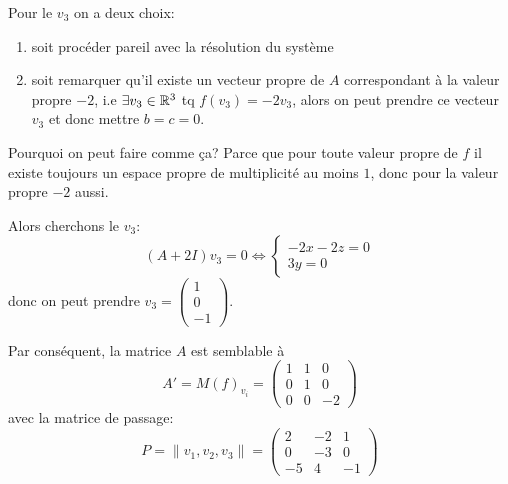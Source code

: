 \begin{eg}
    Pour le $v_3$ on a deux choix:
     \begin{enumerate}
        \item soit procéder pareil avec la résolution du système
        \item soit remarquer qu'il existe un vecteur propre de $A$ correspondant à la valeur propre  $-2$, i.e  $\exists v_3 \in \mathbb{R}^3$ tq $f(v_3) = -2 v_3$, alors on peut prendre ce vecteur  $v_3$ et donc mettre  $b = c = 0$.
    \end{enumerate}
    \begin{remark}
       Pourquoi on peut faire comme ça? Parce que pour toute valeur propre de $f$ il existe toujours un espace propre de multiplicité au moins  $1$, donc pour  la valeur propre  $-2$ aussi. 
    \end{remark}
    Alors cherchons le $v_3$:
     \[
         (A + 2I)v_3 = 0 \iff \begin{cases}
             -2x - 2z = 0\\
             3y = 0
         \end{cases}
    \]
    donc on peut prendre $v_3 = \begin{pmatrix} 1 \\ 0 \\ -1 \end{pmatrix} $.
    
    Par conséquent, la matrice $A$ est semblable à 
     \[
    A' = M(f)_{v_i} = \begin{pmatrix} 
        1 & 1 & 0\\
        0 & 1 & 0\\
        0 & 0 & -2
    \end{pmatrix} 
    \] 
    avec la matrice de passage:
    \[
    P = \|v_1, v_2, v_3\| = \begin{pmatrix} 
        2 & -2 & 1\\
        0 & -3 & 0\\
        -5 & 4 & -1
    \end{pmatrix} 
    \] 
\end{eg}

